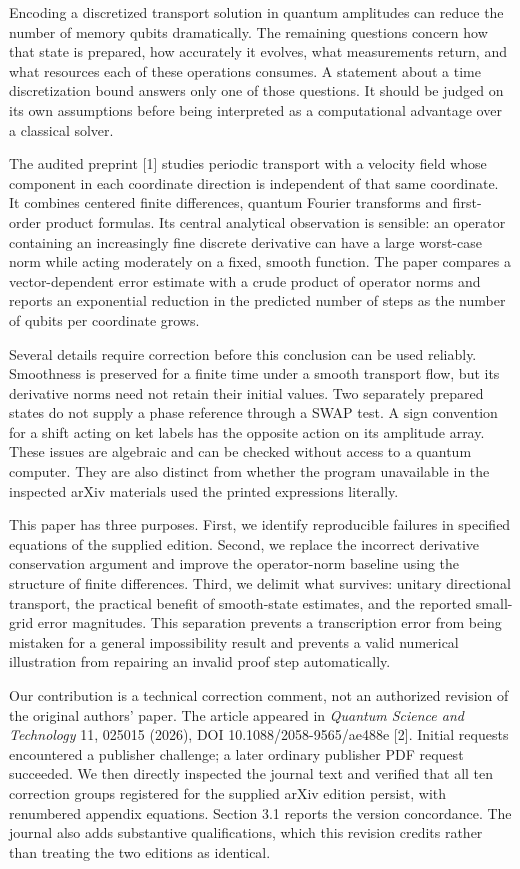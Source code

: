 Encoding a discretized transport solution in quantum amplitudes can
reduce the number of memory qubits dramatically. The remaining questions
concern how that state is prepared, how accurately it evolves, what
measurements return, and what resources each of these operations
consumes. A statement about a time discretization bound answers only one
of those questions. It should be judged on its own assumptions before
being interpreted as a computational advantage over a classical solver.

The audited preprint {[}1{]} studies periodic transport with a velocity
field whose component in each coordinate direction is independent of
that same coordinate. It combines centered finite differences, quantum
Fourier transforms and first-order product formulas. Its central
analytical observation is sensible: an operator containing an
increasingly fine discrete derivative can have a large worst-case norm
while acting moderately on a fixed, smooth function. The paper compares
a vector-dependent error estimate with a crude product of operator norms
and reports an exponential reduction in the predicted number of steps as
the number of qubits per coordinate grows.

Several details require correction before this conclusion can be used
reliably. Smoothness is preserved for a finite time under a smooth
transport flow, but its derivative norms need not retain their initial
values. Two separately prepared states do not supply a phase reference
through a SWAP test. A sign convention for a shift acting on ket labels
has the opposite action on its amplitude array. These issues are
algebraic and can be checked without access to a quantum computer. They
are also distinct from whether the program unavailable in the inspected
arXiv materials used the printed expressions literally.

This paper has three purposes. First, we identify reproducible failures
in specified equations of the supplied edition. Second, we replace the
incorrect derivative conservation argument and improve the operator-norm
baseline using the structure of finite differences. Third, we delimit
what survives: unitary directional transport, the practical benefit of
smooth-state estimates, and the reported small-grid error magnitudes.
This separation prevents a transcription error from being mistaken for a
general impossibility result and prevents a valid numerical illustration
from repairing an invalid proof step automatically.

Our contribution is a technical correction comment, not an authorized
revision of the original authors' paper. The article appeared in
\emph{Quantum Science and Technology} 11, 025015 (2026), DOI
10.1088/2058-9565/ae488e {[}2{]}. Initial requests encountered a
publisher challenge; a later ordinary publisher PDF request succeeded.
We then directly inspected the journal text and verified that all ten
correction groups registered for the supplied arXiv edition persist,
with renumbered appendix equations. Section 3.1 reports the version
concordance. The journal also adds substantive qualifications, which
this revision credits rather than treating the two editions as
identical.

